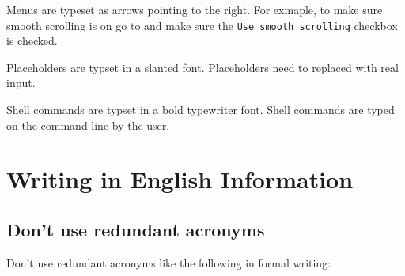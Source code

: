 {  \Describe
  {}
  {%
    Menus are typeset as arrows pointing to the right.
    For exmaple,
    to make sure smooth scrolling is on go to
    and make sure the
    {\tt Use smooth scrolling\/}
    checkbox is checked.%
  }

  \Describe
  {}
  {%
    Placeholders are typset in a slanted font.
    Placeholders need to replaced with real input.%
  }

  \Describe
  {}
  {%
    Shell commands are typset in a bold typewriter font.
    Shell commands are typed on the command line by the user.%
  }

}


\section{Writing in English Information}

\subsection{Don't use redundant acronyms}

Don't use redundant acronyms
\cite{
  fun-with-words2023,
  rome2020,
  redundant-acronym-phrases,
  knight,
  ras-syndrome,
  lrdg2020,
  everhart,
  cox2018%
}
like the following in
formal writing:

